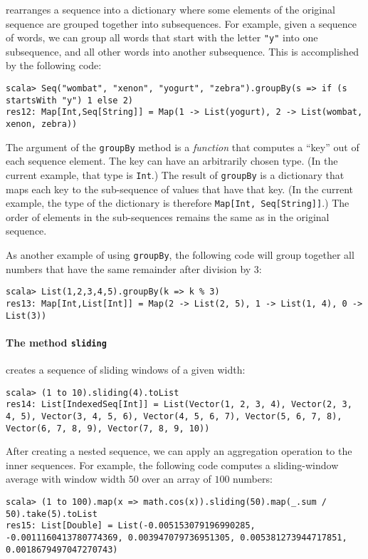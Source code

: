 rearranges a sequence into a dictionary where some elements of the
original sequence are grouped together into subsequences. For example,
given a sequence of words, we can group all words that start with
the letter \lstinline!"y"! into one subsequence, and all other words
into another subsequence. This is accomplished by the following code:
\begin{lstlisting}
scala> Seq("wombat", "xenon", "yogurt", "zebra").groupBy(s => if (s startsWith "y") 1 else 2)
res12: Map[Int,Seq[String]] = Map(1 -> List(yogurt), 2 -> List(wombat, xenon, zebra))
\end{lstlisting}
The argument of the \lstinline!groupBy! method is a \emph{function}
that computes a \textsf{``}key\textsf{''} out of each sequence element. The key can
have an arbitrarily chosen type. (In the current example, that type
is \lstinline!Int!.) The result of \lstinline!groupBy! is a dictionary
that maps each key to the sub-sequence of values that have that key.
(In the current example, the type of the dictionary is therefore \lstinline!Map[Int, Seq[String]]!.)
The order of elements in the sub-sequences remains the same as in
the original sequence.

As another example of using \lstinline!groupBy!, the following code
will group together all numbers that have the same remainder after
division by $3$:
\begin{lstlisting}
scala> List(1,2,3,4,5).groupBy(k => k % 3)
res13: Map[Int,List[Int]] = Map(2 -> List(2, 5), 1 -> List(1, 4), 0 -> List(3))
\end{lstlisting}


\paragraph*{The method \texttt{sliding}}

creates a sequence of sliding windows of a given width:
\begin{lstlisting}
scala> (1 to 10).sliding(4).toList
res14: List[IndexedSeq[Int]] = List(Vector(1, 2, 3, 4), Vector(2, 3, 4, 5), Vector(3, 4, 5, 6), Vector(4, 5, 6, 7), Vector(5, 6, 7, 8), Vector(6, 7, 8, 9), Vector(7, 8, 9, 10))
\end{lstlisting}
After creating a nested sequence, we can apply an aggregation operation
to the inner sequences. For example, the following code computes a
sliding-window average with window width $50$ over an array of $100$
numbers:
\begin{lstlisting}
scala> (1 to 100).map(x => math.cos(x)).sliding(50).map(_.sum / 50).take(5).toList
res15: List[Double] = List(-0.005153079196990285, -0.0011160413780774369, 0.003947079736951305, 0.005381273944717851, 0.0018679497047270743)
\end{lstlisting}


